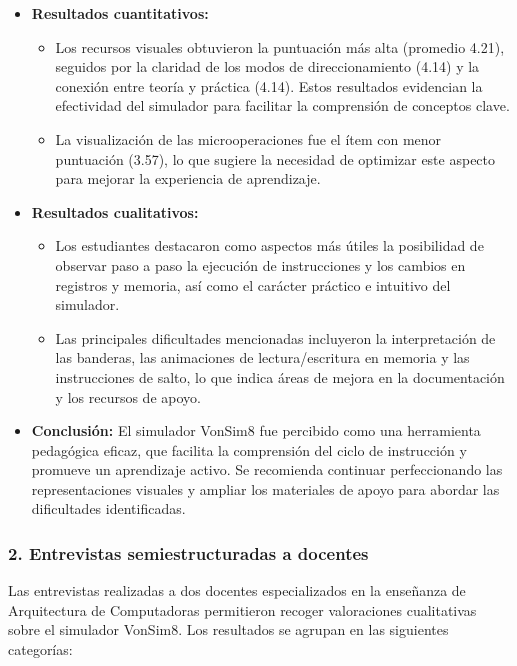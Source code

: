 \documentclass[12pt,oneside]{templates/unerthesis}
\providecommand{\tightlist}{%
  \setlength{\itemsep}{0pt}\setlength{\parskip}{0pt}}
\begin{document}
\begin{itemize}
\tightlist
\item
  \textbf{Resultados cuantitativos:}

  \begin{itemize}
  \tightlist
  \item
    Los recursos visuales obtuvieron la puntuación más alta (promedio 4.21), seguidos por la claridad de los modos de direccionamiento (4.14) y la conexión entre teoría y práctica (4.14). Estos resultados evidencian la efectividad del simulador para facilitar la comprensión de conceptos clave.
  \item
    La visualización de las microoperaciones fue el ítem con menor puntuación (3.57), lo que sugiere la necesidad de optimizar este aspecto para mejorar la experiencia de aprendizaje.
  \end{itemize}
\item
  \textbf{Resultados cualitativos:}

  \begin{itemize}
  \tightlist
  \item
    Los estudiantes destacaron como aspectos más útiles la posibilidad de observar paso a paso la ejecución de instrucciones y los cambios en registros y memoria, así como el carácter práctico e intuitivo del simulador.
  \item
    Las principales dificultades mencionadas incluyeron la interpretación de las banderas, las animaciones de lectura/escritura en memoria y las instrucciones de salto, lo que indica áreas de mejora en la documentación y los recursos de apoyo.
  \end{itemize}
\item
  \textbf{Conclusión:}
  El simulador VonSim8 fue percibido como una herramienta pedagógica eficaz, que facilita la comprensión del ciclo de instrucción y promueve un aprendizaje activo. Se recomienda continuar perfeccionando las representaciones visuales y ampliar los materiales de apoyo para abordar las dificultades identificadas.
\end{itemize}

\hypertarget{entrevistas-semiestructuradas-a-docentes}{%
\subsubsection{2. Entrevistas semiestructuradas a docentes}\label{entrevistas-semiestructuradas-a-docentes}}

Las entrevistas realizadas a dos docentes especializados en la enseñanza de Arquitectura de Computadoras permitieron recoger valoraciones cualitativas sobre el simulador VonSim8. Los resultados se agrupan en las siguientes categorías:
\end{document}
